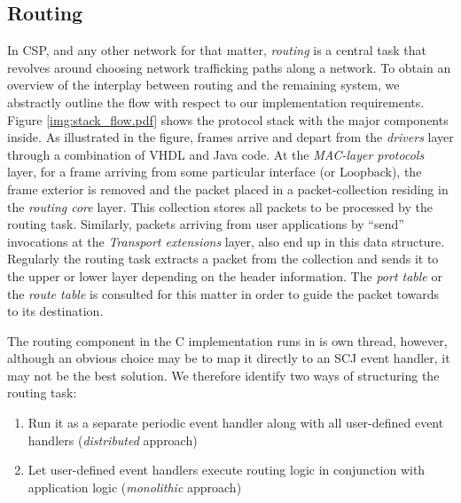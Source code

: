 \subsection{Routing}
\label{sec:routing}
In CSP, and any other network for that matter, \textit{routing} is a central task that revolves around choosing network trafficking paths along a network. To obtain an overview of the interplay between routing and the remaining system, we abstractly outline the flow with respect to our implementation requirements. Figure \ref{img:stack_flow.pdf} shows the protocol stack with the major components inside. As illustrated in the figure, frames arrive and depart from the \textit{drivers} layer through a combination of VHDL and Java code. At the \textit{MAC-layer protocols} layer, for a frame arriving from some particular interface (\iic or Loopback), the frame exterior is removed and the packet placed in a packet-collection residing in the \textit{routing core} layer. This collection stores all packets to be processed by the routing task. Similarly, packets arriving from user applications by ``send'' invocations at the \textit{Transport extensions} layer, also end up in this data structure. Regularly the routing task extracts a packet from the collection and sends it to the upper or lower layer depending on the header information. The \textit{port table} or the \textit{route table} is consulted for this matter in order to guide the packet towards to its destination.

The routing component in the C implementation runs in is own thread, however, although an obvious choice may be to map it directly to an SCJ event handler, it may not be the best solution. We therefore identify two ways of structuring the routing task:

\begin{enumerate}
	\item Run it as a separate periodic event handler along with all user-defined event handlers (\textit{distributed} approach)
	\item Let user-defined event handlers execute routing logic in conjunction with application logic (\textit{monolithic} approach)
\end{enumerate}

